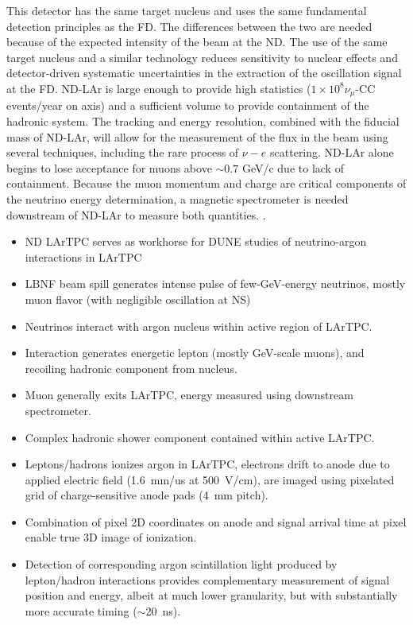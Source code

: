 This detector has the same target nucleus and uses the same fundamental detection principles
as the FD. The differences between the two are needed because of the expected intensity of the
beam at the ND. The use of the same target nucleus and a similar technology reduces sensitivity
to nuclear effects and detector-driven systematic uncertainties in the extraction of the oscillation
signal at the FD. ND-LAr is large enough to provide high statistics ($1 \times 10^8 \nu_\mu$-CC events/year
on axis) and a sufficient volume to provide containment of the hadronic system. The tracking and
energy resolution, combined with the fiducial mass of ND-LAr, will allow for the measurement of
the flux in the beam using several techniques, including the rare process of $\nu - e$ scattering. ND-LAr alone begins to lose acceptance for muons above $\sim0.7$ GeV/c due to lack of containment.
Because the muon momentum and charge are critical components of the neutrino energy determination, a magnetic spectrometer is needed downstream of ND-LAr to measure both quantities.
.


\begin{itemize}
    \item ND LArTPC serves as workhorse for DUNE studies of neutrino-argon interactions in LArTPC
    \item LBNF beam spill generates intense pulse of few-GeV-energy neutrinos, mostly muon flavor (with negligible oscillation at NS)
    \item Neutrinos interact with argon nucleus within active region of LArTPC.
    \item Interaction generates energetic lepton (mostly GeV-scale muons), and recoiling hadronic component from nucleus.
    \item Muon generally exits LArTPC, energy measured using downstream spectrometer.
    \item Complex hadronic shower component contained within active LArTPC.
    \item Leptons/hadrons ionizes argon in LArTPC, electrons drift to anode due to applied electric field (1.6~mm/us at 500~V/cm), are imaged using pixelated grid of charge-sensitive anode pads (4~mm pitch).  
    \item Combination of pixel 2D coordinates on anode and signal arrival time at pixel enable true 3D image of ionization.
    \item Detection of corresponding argon scintillation light produced by lepton/hadron interactions provides complementary measurement of signal position and energy, albeit at much lower granularity, but with substantially more accurate timing ($\sim$20~ns).
\end{itemize}

